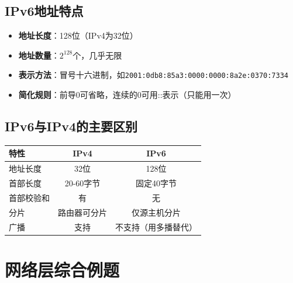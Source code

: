 \subsection{IPv6地址特点}
\begin{itemize}[leftmargin=2em,itemsep=0pt]
    \item \textbf{地址长度}：128位（IPv4为32位）
    \item \textbf{地址数量}：$2^{128}$个，几乎无限
    \item \textbf{表示方法}：冒号十六进制，如\texttt{2001:0db8:85a3:0000:0000:8a2e:0370:7334}
    \item \textbf{简化规则}：前导0可省略，连续的0可用::表示（只能用一次）
\end{itemize}

\subsection{IPv6与IPv4的主要区别}
\begin{table}[htbp]
\centering\small
\begin{tabular}{lcc}
\toprule
\textbf{特性} & \textbf{IPv4} & \textbf{IPv6} \\
\midrule
地址长度 & 32位 & 128位 \\
首部长度 & 20-60字节 & 固定40字节 \\
首部校验和 & 有 & 无 \\
分片 & 路由器可分片 & 仅源主机分片 \\
广播 & 支持 & 不支持（用多播替代） \\
\bottomrule
\end{tabular}
\end{table}

\section{网络层综合例题}

